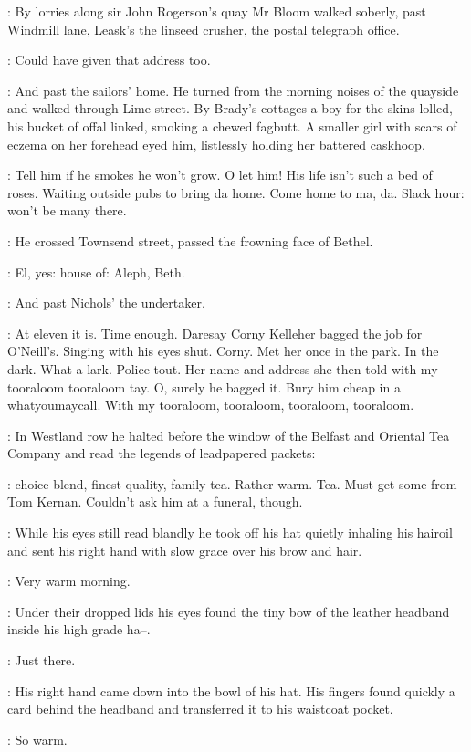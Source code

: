 :
By lorries along sir John Rogerson's quay
Mr Bloom walked soberly,
past Windmill lane,
Leask's the linseed crusher,
the postal telegraph office.

\BloomInt:
Could have given that address too.

:
And past the sailors' home.
He turned from the morning noises of the quayside
and walked through Lime street.
By Brady's cottages
a boy for the skins lolled,
his bucket of offal linked,
smoking a chewed fagbutt.
A smaller girl with scars of eczema on her forehead
eyed him,
listlessly holding her battered caskhoop.

\BloomInt:
Tell him if he smokes he won't grow.
O let him!
His life isn't such a bed of roses.
Waiting outside pubs to bring da home.
Come home to ma, da.
Slack hour: won't be many there.

:
He crossed Townsend street,
passed the frowning face of Bethel.

\BloomInt:
El, yes:
house of: Aleph, Beth.

:
And past Nichols' the undertaker.

\BloomInt:
At eleven it is.
Time enough.
Daresay Corny Kelleher bagged the job for O'Neill's.
Singing with his eyes shut.
Corny.
Met her once in the park.
In the dark.
What a lark.
Police tout.
Her name and address she then told
with my tooraloom tooraloom tay.
O, surely he bagged it.
Bury him cheap in a whatyoumaycall.
With my tooraloom, tooraloom, tooraloom, tooraloom.

:
In Westland row
he halted before the window of the Belfast and Oriental Tea Company
and read the legends of leadpapered packets:

\BloomInt:
choice blend, finest quality, family tea.
Rather warm.
Tea.
Must get some from Tom Kernan.
Couldn't ask him at a funeral, though.

:
While his eyes still read blandly
he took off his hat
quietly inhaling his hairoil
and sent his right hand with slow grace over his brow and hair.

\BloomInt:
Very warm morning.

:
Under their dropped lids
his eyes found the tiny bow of the leather headband inside his high grade ha--.

\BloomInt:
Just there.

:
His right hand came down into the bowl of his hat.
His fingers found quickly a card behind the headband
and transferred it to his waistcoat pocket.

\BloomInt:
So warm.

